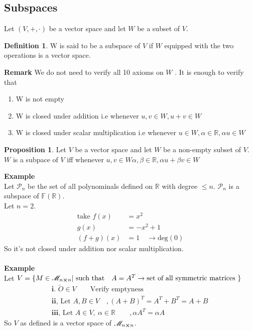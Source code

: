 \documentclass[
12pt,
]{article}
\theoremstyle{definition}
\theoremstyle{definition}
\theoremstyle{definition}
\newtheorem{Definition}{Definition}[section]
\theoremstyle{definition}
\newtheorem{Proposition}{Proposition}[section]
\begin{document}
\subsection{Subspaces}
Let $(V, + , \cdot )$ be a vector space and let $W$ be a subset of $V$.
\begin{Definition}
	W is said to be a subspace of $V$ if $W$ equipped with the two operations is a vector space. 
\end{Definition}
\textbf{Remark} We do not need to verify all 10 axioms on $W$ . It is enough to verify that 
\begin{enumerate}
	\item W is not empty  
	\item W is closed under addition i.e whenever $u,v \in W, u+v \in W$ 
	\item W is closed under scalar multiplication \newline i.e whenever $u \in W , \alpha \in \mathbb{R}, \alpha u \in W$
\end{enumerate}
\begin{Proposition}
	Let $V$ be a vector space and let $W$ be a non-empty subset of $V$. $W$ is a subpace of $V$ iff whenever $u,v \in W \alpha , \beta \in \mathbb{R} , \alpha u + \beta v \in W $
\end{Proposition}
\textbf{Example}\\
Let $\mathcal{P}_n$ be the set of all polynominals defined on $\mathbb{R}$ with degree $\leq n$. $\mathcal{P}_n$ is a subspace of $\mathbb{F}(\mathbb{R})$. \\
Let $n = 2$.
\begin{align*}
	\text{take } f(x) &= x^2 \\	
	g(x) &= -x^2 +1 \\(f+g)(x) 
	&= 1 \quad \xrightarrow{} \text{deg}(0)
 \end{align*}
So it's not closed under addition nor scalar multiplication. \\ \\ 
\textbf{Example}\\
Let $V = \{M \in \mathscr{M}_{n\cross n} | \text{ such that} \quad A=A^{T} \xrightarrow{} \text{set of all  symmetric matrices } \}$\\
\begin{align*}
	&\textbf{i. } \utilde{O} \in V \qquad \text{Verify emptyness} \\
	&\textbf{ii, } \text{Let } A,B \in V \quad , (A+B)^{T} = A^T + B^T = A + B \quad \\
	&\textbf{iii, } \text{Let } A \in V , \ \alpha \in \mathbb{R} \qquad , \alpha A^T = \alpha A
\end{align*}
So $V$ as defined is a vector space of $\mathscr{M}_{n\cross n}$.
\end{document}
